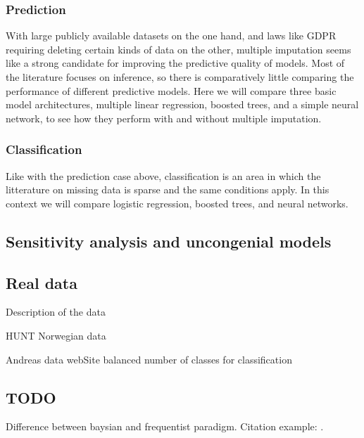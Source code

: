 \documentclass{article}
\begin{document}
	\subsubsection{Prediction}
	With large publicly available datasets on the one hand, and laws like GDPR requiring deleting certain kinds of data on the other, multiple imputation seems like a strong candidate for improving the predictive quality of models. Most of the literature focuses on inference, so there is comparatively little comparing the performance of different predictive models. Here we will compare three basic model architectures, multiple linear regression, boosted trees, and a simple neural network, to see how they perform with and without multiple imputation.
	
	
	
	
	\subsubsection{Classification}
	Like with the prediction case above, classification is an area in which the litterature on missing data is sparse and the same conditions apply. In this context we will compare logistic regression, boosted trees, and neural networks.
	
	
	\subsection{Sensitivity analysis and uncongenial models}
	
	\subsection{Real data}
	
	Description of the data
	
	HUNT Norwegian data
	
	Andreas data webSite
	balanced number of classes for classification
	
	
	\subsection{TODO}
	Difference between baysian and frequentist paradigm.
	Citation example:
	\cite[P.10]{grund_pooling_2016}.

		
	
	
\end{document}
